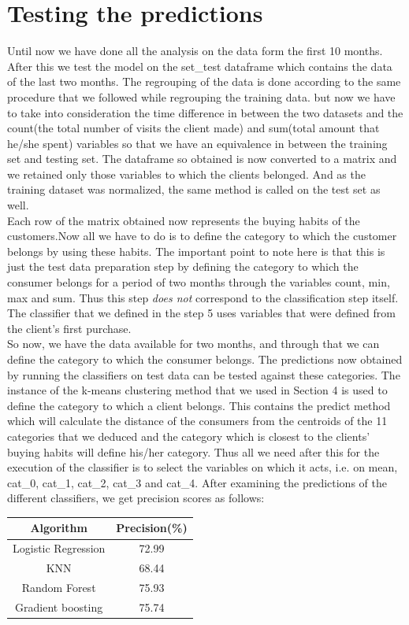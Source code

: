 \section{Testing the predictions}
Until now we have done all the analysis on the data form the first 10 months. After this we test the model on the set\_test dataframe which contains the data of the last two months. The regrouping of the data is done according to the same procedure that we followed while regrouping the training data. but now we have to take into consideration the time difference in between the two datasets and the count(the total number of visits the client made) and sum(total amount that he/she spent) variables so that we have an equivalence in between the training set and testing set. The dataframe so obtained is now converted to a matrix and we retained only those variables to which the clients belonged. And as the training dataset was normalized, the same method is called on the test set as well.\\
Each row of the matrix obtained now represents the buying habits of the customers.Now all we have to do is to define the category to which the customer belongs by using these habits. The important point to note here is that this is just the test data preparation step by defining the category to which the consumer belongs for a period of two months through the variables count, min, max and sum. Thus this step \emph{does not} correspond to the classification step itself. The classifier that we defined in the step 5 uses variables that were defined from the client's first purchase.\\
So now, we have the data available for two months, and through that we can define the category to which the consumer belongs. The predictions now obtained by running the classifiers on test data can be tested against these categories. The instance of the k-means clustering method that we used in Section 4 is used to define the category to which a client belongs. This contains the predict method which will calculate the distance of the consumers from the centroids of the 11 categories that we deduced and the category which is closest to the clients' buying habits will define his/her category. Thus all we need after this for the execution of the classifier is to select the variables on which it acts, i.e. on mean, cat\_0, cat\_1, cat\_2, cat\_3 and cat\_4. After examining the predictions of the different classifiers, we get precision scores as follows:\\ 
\begin{center}
 \begin{tabular}{|c | c|} 
 \hline
 Algorithm & Precision(\%) \\ [0.5ex] 
 \hline
 Logistic Regression & 72.99\\ 
 \hline
 KNN & 68.44 \\
 \hline
 Random Forest & 75.93 \\
 \hline
 Gradient boosting & 75.74 \\
 \hline
 
\end{tabular}
\end{center}

